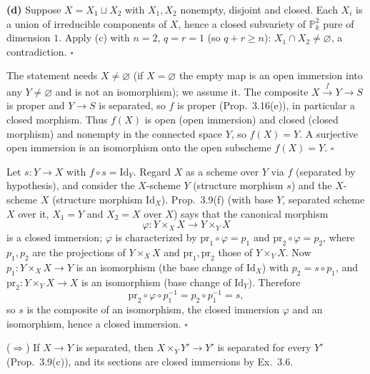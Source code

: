 \documentclass[11pt]{article}
\begin{document}
\textbf{(d)} Suppose $X=X_1\sqcup X_2$ with $X_1,X_2$ nonempty, disjoint and closed. Each $X_i$ is a union of irreducible components of $X$, hence a closed subvariety of $\mathbb P^2_k$ pure of dimension $1$. Apply (c) with $n=2$, $q=r=1$ (so $q+r\ge n$): $X_1\cap X_2\ne\varnothing$, a contradiction. \hfill$\square$

\pf
The statement needs $X\neq\varnothing$ (if $X=\varnothing$ the empty map is an open immersion into any $Y\ne\varnothing$ and is not an isomorphism); we assume it. The composite $X\xrightarrow{f}Y\to S$ is proper and $Y\to S$ is separated, so $f$ is proper (Prop.~3.16(e)), in particular a closed morphism. Thus $f(X)$ is open (open immersion) and closed (closed morphism) and nonempty in the connected space $Y$, so $f(X)=Y$. A surjective open immersion is an isomorphism onto the open subscheme $f(X)=Y$. \hfill$\square$

\pf
Let $s:Y\to X$ with $f\circ s=\mathrm{Id}_Y$. Regard $X$ as a scheme over $Y$ via $f$ (separated by hypothesis), and consider the $X$-scheme $Y$ (structure morphism $s$) and the $X$-scheme $X$ (structure morphism $\mathrm{Id}_X$). Prop.~3.9(f) (with base $Y$, separated scheme $X$ over it, $X_1=Y$ and $X_2=X$ over $X$) says that the canonical morphism
\[ \varphi: Y\times_XX\to Y\times_YX \]
is a closed immersion; $\varphi$ is characterized by $\mathrm{pr}_1\circ\varphi=p_1$ and $\mathrm{pr}_2\circ\varphi=p_2$, where $p_1,p_2$ are the projections of $Y\times_XX$ and $\mathrm{pr}_1,\mathrm{pr}_2$ those of $Y\times_YX$. Now $p_1:Y\times_XX\to Y$ is an isomorphism (the base change of $\mathrm{Id}_X$) with $p_2=s\circ p_1$, and $\mathrm{pr}_2:Y\times_YX\to X$ is an isomorphism (base change of $\mathrm{Id}_Y$). Therefore
\[ \mathrm{pr}_2\circ\varphi\circ p_1^{-1}=p_2\circ p_1^{-1}=s, \]
so $s$ is the composite of an isomorphism, the closed immersion $\varphi$ and an isomorphism, hence a closed immersion. \hfill$\square$

\pf
($\Rightarrow$) If $X\to Y$ is separated, then $X\times_YY'\to Y'$ is separated for every $Y'$ (Prop.~3.9(c)), and its sections are closed immersions by Ex.~3.6.
\end{document}
